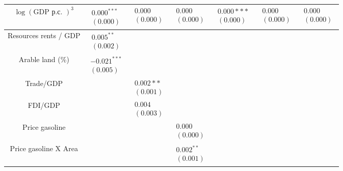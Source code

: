 \documentclass[10pt]{article}
\begin{document}
\begin{center}
\begin{tabular}{|c|c|c|c|c|c|c|}
$\log (\mathrm{GDP} \text { р.с. })^{3}$ & $\begin{array}{l}0.000^{* * *} \\ (0.000)\end{array}$ & $\begin{array}{l}0.000 \\ (0.000)\end{array}$ & $\begin{array}{l}0.000 \\ (0.000)\end{array}$ & $\begin{array}{l}0.000 * * * \\ (0.000)\end{array}$ & $\begin{array}{l}0.000 \\ (0.000)\end{array}$ & $\begin{array}{l}0.000 \\ (0.000)\end{array}$ \\
\hline
Resources rents / GDP & $\begin{array}{l}0.005^{* *} \\ (0.002)\end{array}$ &  &  &  &  &  \\
\hline
Arable land (\%) & $\begin{array}{l}-0.021^{* * *} \\ (0.005)\end{array}$ &  &  &  &  &  \\
\hline
Trade/GDP &  & $\begin{array}{l}0.002 * * \\ (0.001)\end{array}$ &  &  &  &  \\
\hline
FDI/GDP &  & $\begin{array}{l}0.004 \\ (0.003)\end{array}$ &  &  &  &  \\
\hline
Price gasoline &  &  & $\begin{array}{l}0.000 \\ (0.000)\end{array}$ &  &  &  \\
\hline
Price gasoline X Area &  &  & $\begin{array}{l}0.002^{* *} \\ (0.001)\end{array}$ &  &  &  \\

\end{tabular}
\end{center}
\end{document}
